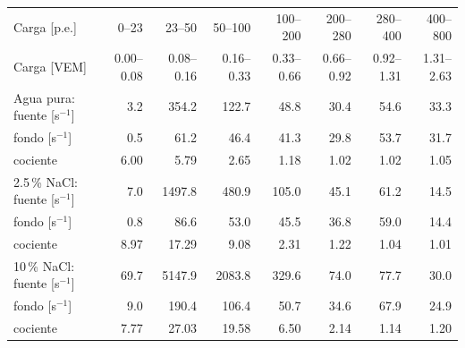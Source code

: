 \begin{tabular}{lrrrrrrr}
\toprule
Carga [p.e.] & 0--23 & 23--50 & 50--100 & 100--200 & 200--280 & 280--400 & 400--800 \\
Carga [VEM] & 0.00--0.08 & 0.08--0.16 & 0.16--0.33 & 0.33--0.66 & 0.66--0.92 & 0.92--1.31 & 1.31--2.63 \\
\midrule
Agua pura: fuente [s$^{-1}$] & 3.2 & 354.2 & 122.7 & 48.8 & 30.4 & 54.6 & 33.3 \\
\quad fondo [s$^{-1}$] & 0.5 & 61.2 & 46.4 & 41.3 & 29.8 & 53.7 & 31.7 \\
\quad cociente & 6.00 & 5.79 & 2.65 & 1.18 & 1.02 & 1.02 & 1.05 \\
2.5\,\% NaCl: fuente [s$^{-1}$] & 7.0 & 1497.8 & 480.9 & 105.0 & 45.1 & 61.2 & 14.5 \\
\quad fondo [s$^{-1}$] & 0.8 & 86.6 & 53.0 & 45.5 & 36.8 & 59.0 & 14.4 \\
\quad cociente & 8.97 & 17.29 & 9.08 & 2.31 & 1.22 & 1.04 & 1.01 \\
10\,\% NaCl: fuente [s$^{-1}$] & 69.7 & 5147.9 & 2083.8 & 329.6 & 74.0 & 77.7 & 30.0 \\
\quad fondo [s$^{-1}$] & 9.0 & 190.4 & 106.4 & 50.7 & 34.6 & 67.9 & 24.9 \\
\quad cociente & 7.77 & 27.03 & 19.58 & 6.50 & 2.14 & 1.14 & 1.20 \\
\bottomrule
\end{tabular}
